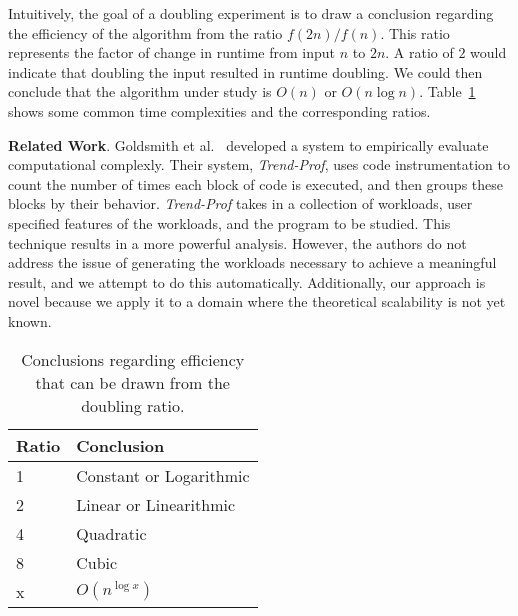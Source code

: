 Intuitively, the goal of a doubling experiment is to draw a conclusion regarding the efficiency of the algorithm from
the ratio $f(2n)/f(n)$. This ratio represents the factor of change in runtime from input $n$ to $2n$. A ratio of $2$
would indicate that doubling the input resulted in runtime doubling. We could then conclude that the algorithm under
study is $O(n)$ or $O(n\log n)$.  Table~\ref{table:ratios} shows some common time complexities and the corresponding
ratios.

{\bf Related Work}. Goldsmith et al.~\cite{Goldsmith2007} developed a system to empirically evaluate computational
complexly.  Their system, \textit{Trend-Prof}, uses code instrumentation to count the number of times each block of code
is executed, and then groups these blocks by their behavior.  \textit{Trend-Prof} takes in a collection of workloads,
user specified features of the workloads, and the program to be studied. This technique results in a more powerful
analysis. However, the authors do not address the issue of generating the workloads necessary to achieve a meaningful
result, and we attempt to do this automatically.  Additionally, our approach is novel because we apply it to a domain
where the theoretical scalability is not yet known.

\begin{table}[t]

  \begin{center}
    \begin{tabular}{l|l}
      Ratio & Conclusion              \\ \hline
      1     & Constant or Logarithmic \\
      2     & Linear or Linearithmic  \\
      4     & Quadratic               \\
      8     & Cubic                   \\
      x     & $O(n^{\log x})$
    \end{tabular}
  \end{center}
  \vspace*{-.15in}

  \caption{Conclusions regarding efficiency that can be drawn from the doubling ratio.}\label{table:ratios}
  \vspace*{-.30in}

\end{table}
